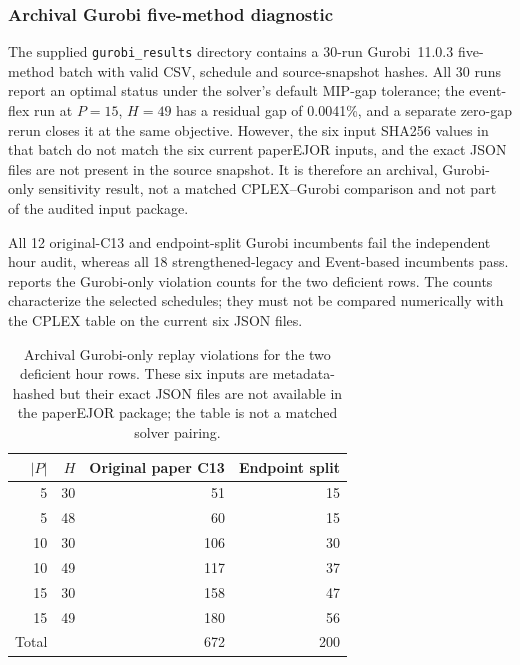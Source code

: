 \subsubsection{Archival Gurobi five-method diagnostic}
\label{subsec:solver_sensitivity}
The supplied \texttt{gurobi\_results} directory contains a 30-run Gurobi~11.0.3
five-method batch with valid CSV, schedule and source-snapshot hashes. All 30
runs report an optimal status under the solver's default MIP-gap tolerance;
the event-flex run at $P=15$, $H=49$ has a residual gap of 0.0041\%, and a
separate zero-gap rerun closes it at the same objective. However, the six input
SHA256 values in that batch do not match the six current paperEJOR inputs, and
the exact JSON files are not present in the source snapshot. It is therefore an
archival, Gurobi-only sensitivity result, not a matched CPLEX--Gurobi comparison
and not part of the audited input package.

All 12 original-C13 and endpoint-split Gurobi incumbents fail the independent
hour audit, whereas all 18 strengthened-legacy and Event-based incumbents pass.
 reports the Gurobi-only violation counts
for the two deficient rows. The counts characterize the selected schedules;
they must not be compared numerically with the CPLEX table on the current six
JSON files.

\begin{table}[t]
\centering\small
\caption{Archival Gurobi-only replay violations for the two deficient hour
rows. These six inputs are metadata-hashed but their exact JSON files are not
available in the paperEJOR package; the table is not a matched solver pairing.}
\label{tab:replay_solver_sensitivity}
\begin{tabular}{rrrr}
\toprule
$|P|$ & $H$ & Original paper C13 & Endpoint split \\
\midrule
5  & 30 & 51  & 15 \\
5  & 48 & 60  & 15 \\
10 & 30 & 106 & 30 \\
10 & 49 & 117 & 37 \\
15 & 30 & 158 & 47 \\
15 & 49 & 180 & 56 \\
\midrule
Total & & 672 & 200 \\
\bottomrule
\end{tabular}
\end{table}

